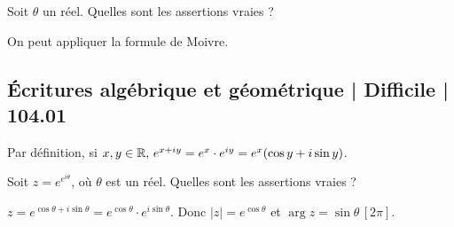 \begin{question} 
Soit $\theta$ un réel.  Quelles sont les assertions vraies ?
\begin{answers}
    \good{$\cos(5\theta)= \cos^5\theta -10\cos^3\theta \sin^2\theta + 5\cos \theta\sin^4 \theta$}
    
    \bad{$\cos(5\theta)= \cos^5\theta +10\cos^3\theta \sin^2\theta + 5\cos \theta\sin^4 \theta$}

    \bad{$\sin(5\theta)= 5\cos^4\theta \sin\theta+10\cos^2\theta \sin^3\theta + \sin^5\theta$}

    \good{$\sin(5\theta)= 5\cos^4\theta \sin\theta-10\cos^2\theta \sin^3\theta + \sin^5\theta$}
\end{answers}
\begin{explanations}
On peut appliquer la formule de Moivre.

\end{explanations}

\end{question}


\subsection{Écritures algébrique et géométrique | Difficile | 104.01}

\begin{question} 
Par définition, si  $x,y \in \mathbb{R}, \, e^{x+iy} = e^x \cdot e^{iy}= e^x (\cos y +i \sin y)$.

Soit $z=e^{e^{i\theta}}$, où $\theta$ est un réel. Quelles sont les assertions vraies ?
\begin{answers}
    
    


\end{answers}
\begin{explanations}
$z= e^{\cos  \theta + i \sin \theta}= e^{\cos\theta}\cdot e^{i \sin \theta}.  $ Donc $|z|=e^{\cos \theta} $ et $\arg z = \sin \theta \, [2\pi]$.
\end{explanations}

\end{question}


